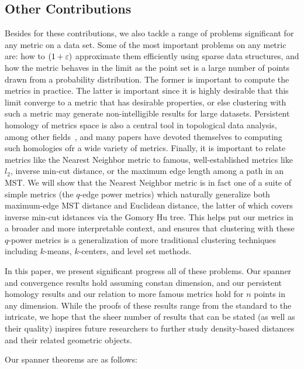 \subsection{Other Contributions}
Besides for these contributions, we also tackle a range of problems
significant for any metric on a data set.  Some of the most important
problems on any metric are: how to $(1+\varepsilon)$ approximate them efficiently
using sparse data structures, and how the metric behaves in the limit as
the point set is a large number of points drawn from a probability
distribution. The former is important to compute the metrics in practice.
The latter is important since it is highly desirable that
this limit converge to a metric that has desirable properties, or else
clustering with such a metric may generate non-intelligible results for
large datasets.  Persistent homology of metrics space is also a central
tool in topological data analysis, among other fields~\cite{}, and many
papers have devoted themselves to computing such homologies ofr a wide
variety of metrics. Finally, it is important to relate metrics
like the Nearest Neighbor metric to famous, well-established metrics like
$l_2$, inverse min-cut distance, or
the maximum edge length among a path in an MST.
We will show that the
Nearest Neighbor metric is in fact one of a suite of simple metrics (the
$q$-edge power metrics) which naturally generalize both maximum-edge MST
distance and Euclidean distance, the latter of which covers inverse min-cut
idstances via the Gomory Hu tree.  This helps put our metrics in a broader
and more interpretable context, and ensures that clustering with these
$q$-power metrics is a generalization of more traditional clustering
techniques including $k$-means, $k$-centers, and level set methods.

In this paper, we present significant progress all of these problems. Our
spanner and convergence results hold assuming constan dimension, and our
persistent homology results and our relation to more famous metrics hold for
$n$ points in any dimension. While the proofs of these results range from
the standard to the intricate, we hope that the sheer number of results
that can be stated (as well as their quality) inspires future researchers
to further study density-based distances and their related geometric objects.

Our spanner theorems are as follows:

 

